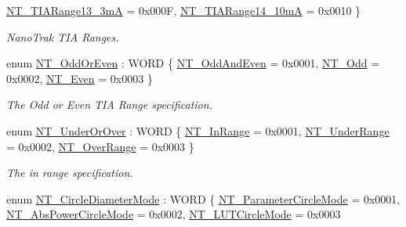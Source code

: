 \begin{DoxyCompactItemize}
\hyperlink{group___common_gga2d700cb6733eb95975d787fb1915a74ba7f199b9a297e0db3c409ed8e0b9edfe1}{N\+T\+\_\+\+T\+I\+A\+Range13\+\_\+3mA} = 0x000F, 
\hyperlink{group___common_gga2d700cb6733eb95975d787fb1915a74bafac78335f8c8e3e7198edd3c76b27f91}{N\+T\+\_\+\+T\+I\+A\+Range14\+\_\+10mA} = 0x0010
 \}\begin{DoxyCompactList}\small\item\em Nano\+Trak T\+IA Ranges. \end{DoxyCompactList}
\item 
enum \hyperlink{group___common_gafd24ee04cee037f4d90814dde903e2b2}{N\+T\+\_\+\+Odd\+Or\+Even} \+: W\+O\+RD \{ \hyperlink{group___common_ggafd24ee04cee037f4d90814dde903e2b2af248897040c994b5ee94f44167ee9ae8}{N\+T\+\_\+\+Odd\+And\+Even} = 0x0001, 
\hyperlink{group___common_ggafd24ee04cee037f4d90814dde903e2b2a7e44776977864a1457146690538332d0}{N\+T\+\_\+\+Odd} = 0x0002, 
\hyperlink{group___common_ggafd24ee04cee037f4d90814dde903e2b2a8dfefd1a0ffec8568ccf293b070a08be}{N\+T\+\_\+\+Even} = 0x0003
 \}\begin{DoxyCompactList}\small\item\em The Odd or Even T\+IA Range specification. \end{DoxyCompactList}
\item 
enum \hyperlink{group___common_ga6808283e2ba5d730e44e28ca096d7766}{N\+T\+\_\+\+Under\+Or\+Over} \+: W\+O\+RD \{ \hyperlink{group___common_gga6808283e2ba5d730e44e28ca096d7766a5bed5a6d6f9f6451a1297554a2bba56b}{N\+T\+\_\+\+In\+Range} = 0x0001, 
\hyperlink{group___common_gga6808283e2ba5d730e44e28ca096d7766ac48b4472e32afbc22017a0ba6239cdac}{N\+T\+\_\+\+Under\+Range} = 0x0002, 
\hyperlink{group___common_gga6808283e2ba5d730e44e28ca096d7766a82e3fa9bc45e401a79842afc3d38f7d8}{N\+T\+\_\+\+Over\+Range} = 0x0003
 \}\begin{DoxyCompactList}\small\item\em The in range specification. \end{DoxyCompactList}
\item 
enum \hyperlink{group___common_gaa15281053f3be4074c276b8d182c3a70}{N\+T\+\_\+\+Circle\+Diameter\+Mode} \+: W\+O\+RD \{ \hyperlink{group___common_ggaa15281053f3be4074c276b8d182c3a70aee132edc18e67de9e1206a81e20376a2}{N\+T\+\_\+\+Parameter\+Circle\+Mode} = 0x0001, 
\hyperlink{group___common_ggaa15281053f3be4074c276b8d182c3a70aa517fad3475bec28f4c16cd85d714c88}{N\+T\+\_\+\+Abs\+Power\+Circle\+Mode} = 0x0002, 
\hyperlink{group___common_ggaa15281053f3be4074c276b8d182c3a70ad378911a152c89c36c110f1cd2846fc8}{N\+T\+\_\+\+L\+U\+T\+Circle\+Mode} = 0x0003

\end{DoxyCompactItemize}

